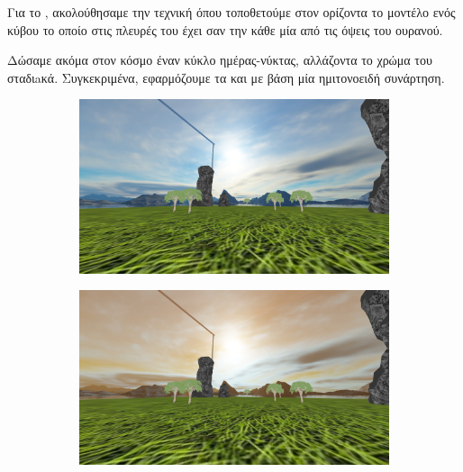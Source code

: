 \documentclass[11pt]{scrartcl} %
\newenvironment{centerimg}[1]%
{%
    \begin{figure}[H]
        #1
    \begin{center}
}%
{%
    \end{center}
    \end{figure}
}
\begin{document}
Για το , ακολούθησαμε την τεχνική όπου τοποθετούμε στον ορίζοντα το μοντέλο ενός κύβου το οποίο 
στις πλευρές του έχει σαν  την κάθε μία από τις όψεις του ουρανού.

Δώσαμε ακόμα στον κόσμο έναν κύκλο ημέρας-νύκτας, αλλάζοντα το χρώμα του  σταδιaκά. Συγκεκριμένα, 
εφαρμόζουμε   τα  και   με βάση μία ημιτονοειδή συνάρτηση.


\begin{centerimg}{\caption{Το  με χρώματα ημέρας και νύκτας.}}
    \begin{subfigure}[b]{0.5\textwidth}
        \includegraphics[width=\textwidth]{./assets/skybox_day.png}
    \end{subfigure}
    \begin{subfigure}[b]{0.5\textwidth}
        \includegraphics[width=\textwidth]{./assets/skybox_night.png}
    \end{subfigure}
\end{centerimg}
\end{document}
